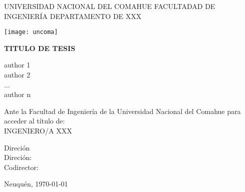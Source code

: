 \begin{titlepage}
    \begin{center}
        UNIVERSIDAD NACIONAL DEL COMAHUE
        FACULTADAD DE INGENIERÍA
        DEPARTAMENTO DE XXX

        \vspace*{1cm}
        \texttt{[image: uncoma]}
        \vspace*{1cm}

        \begin{large}
            \uppercase{\textbf{Titulo de tesis}}
        \end{large}

        \vspace*{1.5cm}

        author 1 \\
        author 2 \\
        ... \\
        author n

        \vspace*{1cm}

        Ante la Facultad de Ingeniería de la Universidad Nacional del Comahue para
        acceder al título de:\\
        INGENIERO/A XXX

        \vspace*{0.8cm}

        Direción\\
        Direción:  \\
        Codirector:

        \vspace*{1cm}
        Neuquén, \today


    \end{center}
\end{titlepage}